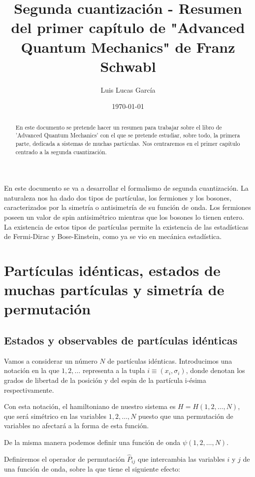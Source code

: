 \documentclass{article} %
\author{Luis Lucas García}
\title{Segunda cuantización - Resumen del primer capítulo de "Advanced Quantum Mechanics" de Franz Schwabl}
\date{\today}
\begin{document}
\maketitle

\begin{abstract}
En este documento se pretende hacer un resumen para trabajar sobre el libro de 'Advanced Quantum Mechanics' \cite{LibroQuantum} con el que se pretende estudiar, sobre todo, la primera parte, dedicada a sistemas de muchas partículas. Nos centraremos en el primer capítulo centrado a la segunda cuantización.
\end{abstract}

\tableofcontents

En este documento se va a desarrollar el formalismo de segunda cuantización. La naturaleza nos ha dado dos tipos de partículas, los fermiones y los bosones, caracterizados por la simetría o antisimetría de su función de onda. Los fermiones poseen un valor de spin antisimétrico mientras que los bosones lo tienen entero. La existencia de estos tipos de partículas permite la existencia de las estadísticas de Fermi-Dirac y Bose-Einstein, como ya se vio en mecánica estadística.

\section{Partículas idénticas, estados de muchas partículas y simetría de permutación}

\subsection{Estados y observables de partículas idénticas}

Vamos a considerar un número $N$ de partículas idénticas. Introducimos una notación en la que $1, 2, \ldots$ representa a la tupla $i \equiv (x_i, \sigma_i)$, donde denotan los grados de libertad de la posición y del espin de la partícula i-ésima respectivamente.

Con esta notación, el hamiltoniano de nuestro sistema es $H = H(1, 2, \ldots, N)$, que será simétrico en las variables $1, 2, \ldots, N$ puesto que una permutación de variables no afectará a la forma de esta función.

De la misma manera podemos definir una función de onda $\psi (1, 2, \ldots, N)$.

Definiremos el operador de permutación $\hat{P}_{ij}$ que intercambia las variables $i$ y $j$ de una función de onda, sobre la que tiene el siguiente efecto:
\end{document}
